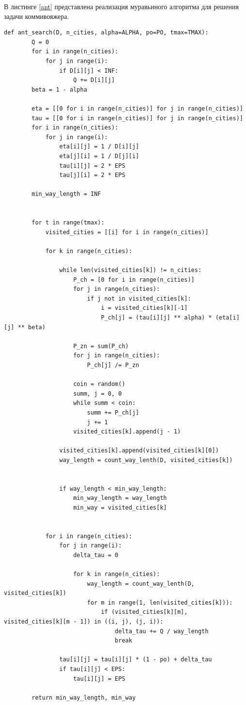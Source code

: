 \clearpage
В листинге \ref{ant} представлена реализация муравьиного алгоритма для решения задачи коммивояжера.


\begin{lstlisting}[caption=Муравьиный алгоритм,
	label={ant}]
	def ant_search(D, n_cities, alpha=ALPHA, po=PO, tmax=TMAX):
		Q = 0
		for i in range(n_cities):
			for j in range(i):
				if D[i][j] < INF:
					Q += D[i][j]
		beta = 1 - alpha
		
		eta = [[0 for i in range(n_cities)] for j in range(n_cities)]
		tau = [[0 for i in range(n_cities)] for j in range(n_cities)]
		for i in range(n_cities):
			for j in range(i):
				eta[i][j] = 1 / D[i][j]
				eta[j][i] = 1 / D[j][i]
				tau[i][j] = 2 * EPS
				tau[j][i] = 2 * EPS
		
		min_way_length = INF
		
	
		for t in range(tmax):
			visited_cities = [[i] for i in range(n_cities)]
		
			for k in range(n_cities):
		
				while len(visited_cities[k]) != n_cities:
					P_ch = [0 for i in range(n_cities)]
					for j in range(n_cities):
						if j not in visited_cities[k]:
							i = visited_cities[k][-1]
							P_ch[j] = (tau[i][j] ** alpha) * (eta[i][j] ** beta)
					
					P_zn = sum(P_ch)
					for j in range(n_cities):
						P_ch[j] /= P_zn
					
					coin = random()
					summ, j = 0, 0
					while summ < coin:
						summ += P_ch[j]
						j += 1
					visited_cities[k].append(j - 1)
				
				visited_cities[k].append(visited_cities[k][0])
				way_length = count_way_lenth(D, visited_cities[k])
				
			
				if way_length < min_way_length:
					min_way_length = way_length
					min_way = visited_cities[k]
			
		
			for i in range(n_cities):
				for j in range(i):
					delta_tau = 0
				
					for k in range(n_cities):
						way_length = count_way_lenth(D, visited_cities[k])
						for m in range(1, len(visited_cities[k])):
							if (visited_cities[k][m], visited_cities[k][m - 1]) in ((i, j), (j, i)):
								delta_tau += Q / way_length
								break
			
				tau[i][j] = tau[i][j] * (1 - po) + delta_tau
				if tau[i][j] < EPS:
					tau[i][j] = EPS
		
		return min_way_length, min_way
\end{lstlisting}

